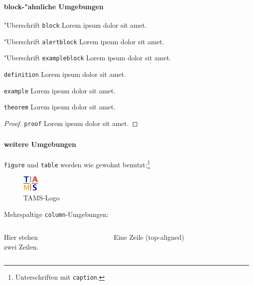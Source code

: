 \documentclass[t]{beamer}
\begin{document}
\begin{frame}[allowframebreaks]
  \frametitle{\insertsection}
  \framesubtitle{block-"ahnliche Umgebungen}
  \small

  \begin{block}{"Uberschrift}
  \texttt{block} Lorem ipsum dolor sit amet.
  \end{block}

  \begin{alertblock}{"Uberschrift}
  \texttt{alertblock} Lorem ipsum dolor sit amet.
  \end{alertblock}

  \begin{exampleblock}{"Uberschrift}
  \texttt{exampleblock} Lorem ipsum dolor sit amet.
  \end{exampleblock}

  \framebreak
  \begin{definition}
  \texttt{definition} Lorem ipsum dolor sit amet.
  \end{definition}

  \begin{example}
  \texttt{example} Lorem ipsum dolor sit amet.
  \end{example}

  \begin{theorem}
  \texttt{theorem} Lorem ipsum dolor sit amet.
  \end{theorem}

  \begin{proof}
  \texttt{proof} Lorem ipsum dolor sit amet.
  \end{proof}
\end{frame}

\begin{frame}
  \frametitle{\insertsection}
  \framesubtitle{weitere Umgebungen}
  \texttt{figure} und \texttt{table} werden wie gewohnt
	benutzt:\footnote{Unterschriften mit \texttt{caption}.}
  \begin{figure}
    \includegraphics[height=8mm]{logoTAMS}
    \caption{TAMS-Logo}
  \end{figure}

  Mehrspaltige \texttt{column}-Umgebungen:
  \begin{columns}[t]
    \begin{column}{4cm}
	Hier stehen\\zwei Zeilen.
    \end{column}
    \begin{column}{4cm}
	Eine Zeile (top-aligned)
    \end{column}
  \end{columns}
\end{frame}
\end{document}
